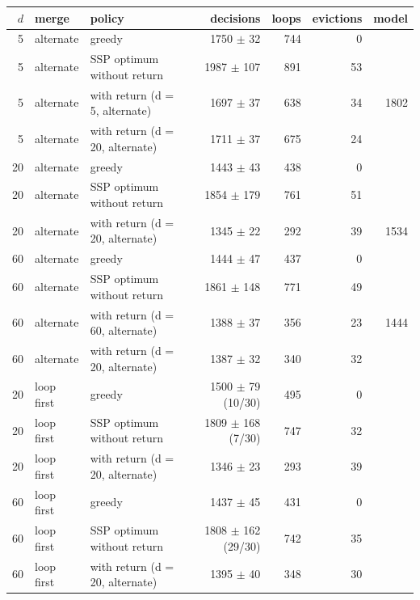 \begin{tabular}{rllrrrr}
\toprule
$d$ & merge & policy & decisions & loops & evictions & model \\
\midrule
5 & alternate & greedy & 1750 $\pm$ 32 & 744 & 0 &  \\
5 & alternate & SSP optimum without return & 1987 $\pm$ 107 & 891 & 53 &  \\
5 & alternate & with return (d = 5, alternate) & 1697 $\pm$ 37 & 638 & 34 & 1802 \\
5 & alternate & with return (d = 20, alternate) & 1711 $\pm$ 37 & 675 & 24 &  \\
20 & alternate & greedy & 1443 $\pm$ 43 & 438 & 0 &  \\
20 & alternate & SSP optimum without return & 1854 $\pm$ 179 & 761 & 51 &  \\
20 & alternate & with return (d = 20, alternate) & 1345 $\pm$ 22 & 292 & 39 & 1534 \\
60 & alternate & greedy & 1444 $\pm$ 47 & 437 & 0 &  \\
60 & alternate & SSP optimum without return & 1861 $\pm$ 148 & 771 & 49 &  \\
60 & alternate & with return (d = 60, alternate) & 1388 $\pm$ 37 & 356 & 23 & 1444 \\
60 & alternate & with return (d = 20, alternate) & 1387 $\pm$ 32 & 340 & 32 &  \\
20 & loop first & greedy & 1500 $\pm$ 79 (10/30) & 495 & 0 &  \\
20 & loop first & SSP optimum without return & 1809 $\pm$ 168 (7/30) & 747 & 32 &  \\
20 & loop first & with return (d = 20, alternate) & 1346 $\pm$ 23 & 293 & 39 &  \\
60 & loop first & greedy & 1437 $\pm$ 45 & 431 & 0 &  \\
60 & loop first & SSP optimum without return & 1808 $\pm$ 162 (29/30) & 742 & 35 &  \\
60 & loop first & with return (d = 20, alternate) & 1395 $\pm$ 40 & 348 & 30 &  \\
\bottomrule
\end{tabular}
